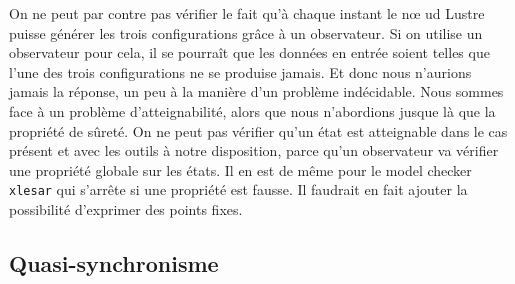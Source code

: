 \documentclass[a4paper]{article}
\begin{document}
On ne peut par contre pas vérifier le fait qu'à chaque instant le n\oe
ud Lustre puisse générer les trois configurations grâce à un
observateur. Si on utilise un observateur pour cela, il se pourraît que
les données en entrée soient telles que l'une des trois configurations
ne se produise jamais. Et donc nous n'aurions jamais la réponse, un
peu à la manière d'un problème indécidable. Nous sommes face à un problème
d'atteignabilité, alors que nous n'abordions jusque là que la propriété de
sûreté. On ne peut pas vérifier qu'un état est atteignable
dans le cas présent et avec les outils à notre disposition, parce
qu'un observateur va vérifier une propriété globale sur les états. Il
en est de même pour le model checker \texttt{xlesar} qui s'arrête si
une propriété est fausse. Il faudrait en fait ajouter la possibilité
d'exprimer des points fixes.

\subsection{Quasi-synchronisme}
\end{document}
